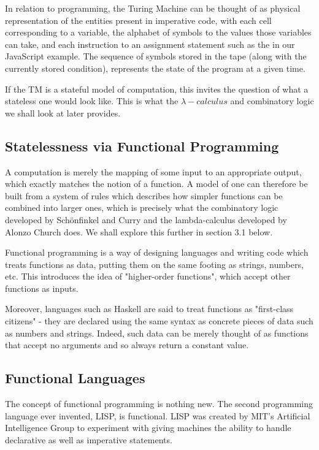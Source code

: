 In relation to programming, the Turing Machine can be thought of as physical representation of the entities present in imperative code, with each cell corresponding to a variable, the alphabet of symbols to the values those variables can take, and each instruction to an assignment statement such as the  in our JavaScript example. The sequence of symbols stored in the tape (along with the currently stored condition), represents the state of the program at a given time.

If the TM is a stateful model of computation, this invites the question of what a stateless one would look like. This is what the $\lambda-calculus$ and combinatory logic we shall look at later provides.

\subsection{Statelessness via Functional Programming}
A computation is merely the mapping of some input to an appropriate output, which exactly matches the notion of a function. A model of one can therefore be built from a system of rules which describes how simpler functions can be combined into larger ones, which is precisely what the combinatory logic developed by Schönfinkel and Curry and the lambda-calculus developed by Alonzo Church does. We shall explore this further in section 3.1 below.

Functional programming is a way of designing languages and writing code which treats functions as data, putting them on the same footing as strings, numbers, etc. This introduces the idea of "higher-order functions", which accept other functions as inputs.

Moreover, languages such as Haskell are said to treat functions as "first-class citizens" - they are declared using the same syntax as concrete pieces of data such as numbers and strings. Indeed, such data can be merely thought of as functions that accept no arguments and so always return a constant value.

\subsection{Functional Languages}
The concept of functional programming is nothing new. The second programming language ever invented, LISP, is functional. LISP was created by MIT's Artificial Intelligence Group to experiment with giving machines the ability to handle declarative as well as imperative statements\cite{RecursiveFunctions}.

